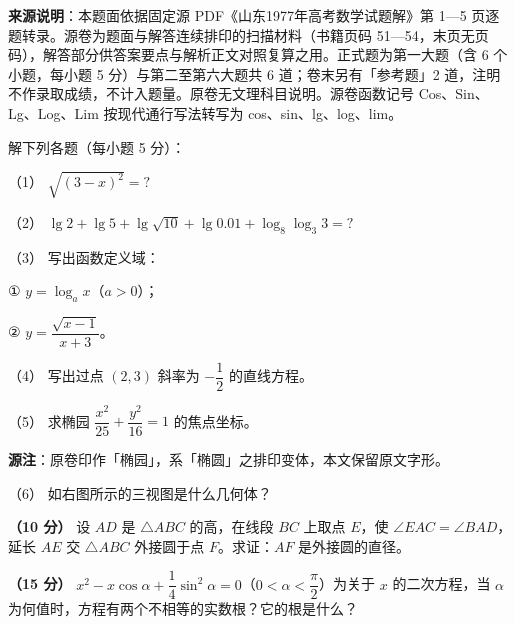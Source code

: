 


\begin{gktip}
\textbf{来源说明}：本题面依据固定源 PDF《山东1977年高考数学试题解》第 1—5 页逐题转录。源卷为题面与解答连续排印的扫描材料（书籍页码 51—54，末页无页码），解答部分供答案要点与解析正文对照复算之用。正式题为第一大题（含 6 个小题，每小题 5 分）与第二至第六大题共 6 道；卷末另有「参考题」2 道，注明不作录取成绩，不计入题量。原卷无文理科目说明。源卷函数记号 Cos、Sin、Lg、Log、Lim 按现代通行写法转写为 cos、sin、lg、log、lim。
\end{gktip}

\Needspace{0.4\textheight}
\begin{question}
解下列各题（每小题 5 分）：

（1） $\sqrt{(3-x)^2}=?$

（2） $\lg 2+\lg 5+\lg\sqrt{10}+\lg 0.01+\log_8\log_3 3=?$

（3） 写出函数定义域：

① $y=\log_a x$（$a>0$）；

② $y=\dfrac{\sqrt{x-1}}{x+3}$。

（4） 写出过点 $(2,3)$ 斜率为 $-\dfrac12$ 的直线方程。

（5） 求椭园 $\dfrac{x^2}{25}+\dfrac{y^2}{16}=1$ 的焦点坐标。

\begin{gktip}
\textbf{源注}：原卷印作「椭园」，系「椭圆」之排印变体，本文保留原文字形。
\end{gktip}

（6） 如右图所示的三视图是什么几何体？
\nopagebreak[4]
\begin{center}\end{center}
\nopagebreak[4]
\Needspace{0.4\textheight}
\end{question}
\begin{question}
\textbf{（10 分）} 设 $AD$ 是 $\triangle ABC$ 的高，在线段 $BC$ 上取点 $E$，使 $\angle EAC=\angle BAD$，延长 $AE$ 交 $\triangle ABC$ 外接圆于点 $F$。求证：$AF$ 是外接圆的直径。
\nopagebreak[4]
\begin{center}\end{center}
\nopagebreak[4]
\end{question}
\begin{question}
\textbf{（15 分）} $x^2-x\cos\alpha+\dfrac14\sin^2\alpha=0$（$0<\alpha<\dfrac{\pi}{2}$）为关于 $x$ 的二次方程，当 $\alpha$ 为何值时，方程有两个不相等的实数根？它的根是什么？

\end{question}
